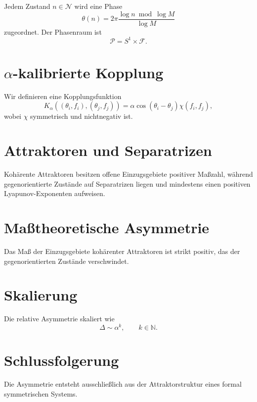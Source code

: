 \documentclass[11pt]{article}
\begin{document}
Jedem Zustand $n\in\mathcal{N}$ wird eine Phase
\[
\theta(n)=2\pi\frac{\log n \bmod \log M}{\log M}
\]
zugeordnet. Der Phasenraum ist
\[
\mathcal{P}=S^1\times\mathcal{F}.
\]

\section{$\alpha$-kalibrierte Kopplung}

Wir definieren eine Kopplungsfunktion
\[
K_\alpha((\theta_i,f_i),(\theta_j,f_j))
=\alpha\cos(\theta_i-\theta_j)\chi(f_i,f_j),
\]
wobei $\chi$ symmetrisch und nichtnegativ ist.

\section{Attraktoren und Separatrizen}

Kohärente Attraktoren besitzen offene Einzugsgebiete positiver Maßzahl, während
gegenorientierte Zustände auf Separatrizen liegen und mindestens einen positiven
Lyapunov-Exponenten aufweisen.

\section{Maßtheoretische Asymmetrie}

Das Maß der Einzugsgebiete kohärenter Attraktoren ist strikt positiv, das der
gegenorientierten Zustände verschwindet.

\section{Skalierung}

Die relative Asymmetrie skaliert wie
\[
\Delta\sim\alpha^k,\qquad k\in\mathbb{N}.
\]

\section{Schlussfolgerung}

Die Asymmetrie entsteht ausschließlich aus der Attraktorstruktur eines formal
symmetrischen Systems.
\end{document}
